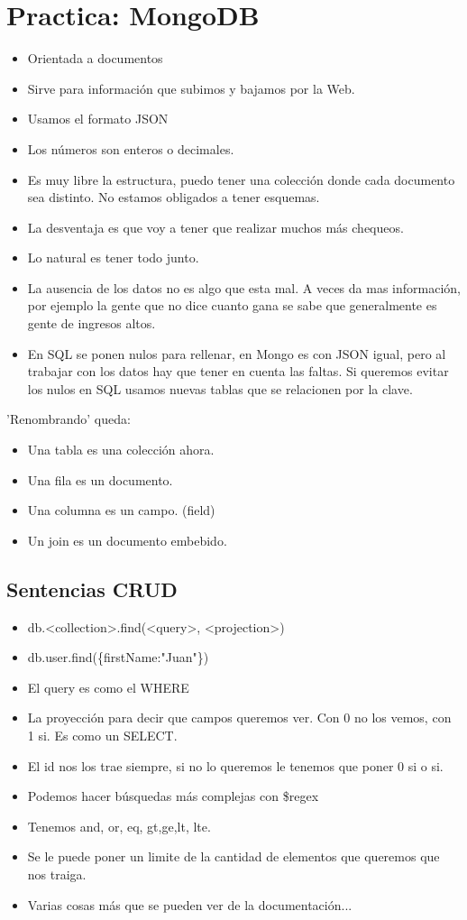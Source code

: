 \section{Practica: MongoDB}

\begin{itemize}
\item Orientada a documentos
\item Sirve para información que subimos y bajamos por la Web.
\item Usamos el formato JSON
\item Los números son enteros o decimales.
\item Es muy libre la estructura, puedo tener una colección donde cada documento sea distinto. No estamos obligados a tener esquemas.
\item La desventaja es que voy a tener que realizar muchos más chequeos.
\item Lo natural es tener todo junto.
\item La ausencia de los datos no es algo que esta mal. A veces da mas información, por ejemplo la gente que no dice cuanto gana se sabe que generalmente es gente de ingresos altos.
\item En SQL se ponen nulos para rellenar, en Mongo es con JSON igual, pero al trabajar con los datos hay que tener en cuenta las faltas. Si queremos evitar los nulos en SQL usamos nuevas tablas que se relacionen por la clave.
\end{itemize}

'Renombrando' queda:

\begin{itemize}
\item Una tabla es una colección ahora.
\item Una fila es un documento.
\item Una columna es un campo. (field)
\item Un join es un documento embebido.
\end{itemize}

\subsection*{Sentencias CRUD}

\begin{itemize}
\item db.<collection>.find(<query>, <projection>)
\item db.user.find(\{firstName:"Juan"\})
\item El query es como el WHERE
\item La proyección para decir que campos queremos ver. Con 0 no los vemos, con 1 si. Es como un SELECT.
\item El id nos los trae siempre, si no lo queremos le tenemos que poner 0 si o si.
\item Podemos hacer búsquedas más complejas con \$regex
\item Tenemos and, or, eq, gt,ge,lt, lte.
\item Se le puede poner un limite de la cantidad de elementos que queremos que nos traiga.
\item Varias cosas más que se pueden ver de la documentación...
\end{itemize}

